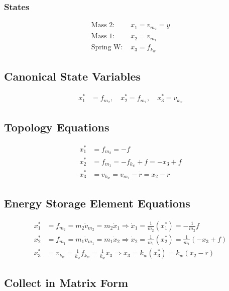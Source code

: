 \documentclass{article}
\begin{document}
\subsubsection{States}
\begin{align*}
\text{Mass 2: } & x_1 = v_{m_2} = \dot{y} \\
\text{Mass 1: } & x_2 = v_{m_1} \\
\text{Spring W: } & x_3 = f_{k_w}
\end{align*}

\subsection{Canonical State Variables}
\begin{align*}
x^*_1 &= f_{m_2}, \quad x^*_2 = f_{m_1}, \quad x^*_3 = v_{k_w}
\end{align*}

\subsection{Topology Equations}
\begin{align*}
x^*_1 &= f_{m_2} = -f \\
x^*_2 &= f_{m_1} = -f_{k_w} + f = -x_3 + f \\
x^*_3 &= v_{k_w} = v_{m_1} - \dot{r} = x_2 - \dot{r}
\end{align*}

\subsection{Energy Storage Element Equations}
\begin{align*}
x^*_1 &= f_{m_2} = m_2 \dot{v}_{m_2} = m_2 \dot{x}_1 \Rightarrow \dot{x}_1 = \frac{1}{m_2} (x_1^*) = -\frac{1}{m_2} f \\
x^*_2 &= f_{m_1} = m_1 \dot{v}_{m_1} = m_1 \dot{x}_2 \Rightarrow \dot{x}_2 = \frac{1}{m_1} (x_2^*) = \frac{1}{m_1} (-x_3 + f) \\
x^*_3 &= v_{k_w} = \frac{1}{k_w} \dot{f}_{k_w} = \frac{1}{k_w} \dot{x}_3 \Rightarrow \dot{x}_3 = k_w(x^*_3) = k_w (x_2 - \dot{r})
\end{align*}

\subsection{Collect in Matrix Form}
   
\end{document}
